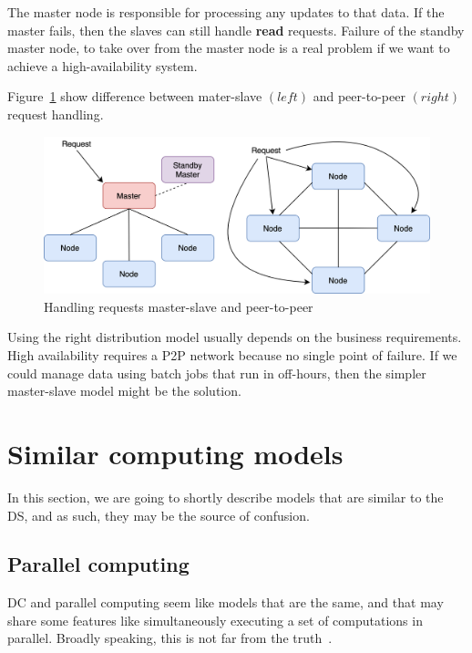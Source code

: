The master node is responsible for processing any updates to that data. If the master fails, then the slaves can still handle \textbf{read} requests. Failure of the standby master node, to take over from the master node is a real problem if we want to achieve a high-availability system.

Figure~\ref{fig:fig16} show difference between mater-slave $(left)$ and peer-to-peer $(right)$ request handling.

\begin{figure}[H]
	\begin{center}
		\includegraphics[scale=0.7]{images/Figure16.png}
	\end{center}
	\vspace{-0.6cm}
	\caption{Handling requests master-slave and peer-to-peer}
	\label{fig:fig16}
\end{figure}

\noindent
Using the right distribution model usually depends on the business requirements. High availability requires a P2P network because no single point of failure. If we could manage data using batch jobs that run in off-hours, then the simpler master-slave model might be the solution.
%
%
\section{Similar computing models}\label{sec:similar_models}
%
In this section, we are going to shortly describe models that are similar to the DS, and as such, they may be the source of confusion.
%
%
\subsection{Parallel computing}\label{sec:parallel_computing}
%
DC and parallel computing seem like models that are the same, and that may share some features like simultaneously executing a set of computations in parallel. Broadly speaking, this is not far from the truth~\cite{Vera16}. 

